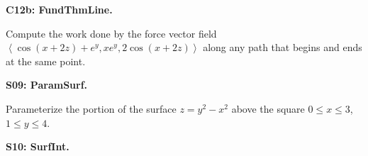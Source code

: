 \documentclass[12pt]{article}
\newcommand{\vect}{\mathbf}
\newcommand{\<}{\left\langle}
\renewcommand{\>}{\right\rangle}
\newcommand{\exerciseHeader}[4]{


  \vspace{0.5em}
  \textbf{#2}
  \vspace{0.5em}

}
\begin{document}
\begin{multicols}{2}
\exerciseHeader{2017 July 21}{C12b: FundThmLine.}{
Apply the Fundamental Theorem of Line Integrals.
}{3/4}

Compute the work done by the force vector field
\(\<\cos(x+2z)+e^y,xe^y,2\cos(x+2z)\>\)
along any path that begins and ends at the same point.

%



%

%

\exerciseHeader{2017 July 24}{S09: ParamSurf.}{
Parametrize surfaces in three-dimensional Euclidean space.
}{3/3}

Parameterize the portion of the surface \(z=y^2-x^2\) above the
square \(0\leq x\leq 3\), \(1\leq y\leq 4\).

\columnbreak

%

\exerciseHeader{2017 July 24}{S10: SurfInt.}{
Compute and apply surface integrals.
}{2/3}


\end{multicols}
\end{document}
